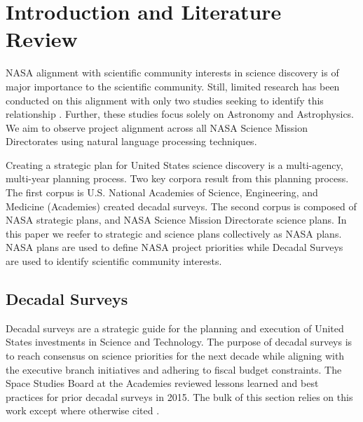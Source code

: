 \documentclass[preprint,12pt]{elsarticle}
\begin{document}


\section{Introduction and Literature Review}


NASA alignment with scientific community interests in science discovery is of major importance to the scientific community. Still, limited research has been conducted on this alignment with only two studies seeking to identify this relationship \cite{Trimble2011} \cite {pan2023seven_decadals}. Further, these studies focus solely on Astronomy and Astrophysics. We aim to observe project alignment across all NASA Science Mission Directorates using natural language processing techniques. 

Creating a strategic plan for United States science discovery is a multi-agency, multi-year planning process. Two key corpora result from this planning process. The first corpus is U.S. National Academies of Science, Engineering, and Medicine (Academies) created decadal surveys. The second corpus is composed of NASA strategic plans, and NASA Science Mission Directorate science plans. In this paper we reefer to strategic and science plans collectively as NASA plans. NASA plans are used to define NASA project priorities while Decadal Surveys are used to identify scientific community interests.

\subsection{Decadal Surveys}


Decadal surveys are a strategic guide for the planning and execution of United States investments in Science and Technology. The purpose of decadal surveys is to reach consensus on science priorities for the next decade while aligning with the executive branch initiatives and adhering to fiscal budget constraints. The Space Studies Board at the Academies reviewed lessons learned and best practices for prior decadal surveys in 2015. The bulk of this section relies on this work except where otherwise cited \cite{Academies2015_lessons}.
\end{document}

